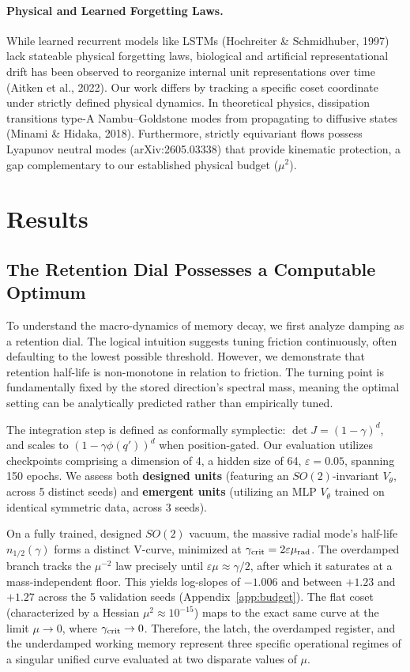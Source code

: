 \documentclass{article}
\begin{document}
\paragraph{Physical and Learned Forgetting Laws.}
While learned recurrent models like LSTMs (Hochreiter \& Schmidhuber, 1997) lack stateable physical forgetting laws, biological and artificial representational drift has been observed to reorganize internal unit representations over time (Aitken et al., 2022). Our work differs by tracking a specific coset coordinate under strictly defined physical dynamics. In theoretical physics, dissipation transitions type-A Nambu--Goldstone modes from propagating to diffusive states (Minami \& Hidaka, 2018). Furthermore, strictly equivariant flows possess Lyapunov neutral modes (arXiv:2605.03338) that provide kinematic protection, a gap complementary to our established physical budget ($\mu^2$).

\section{Results}\label{sec:results}

\subsection{The Retention Dial Possesses a Computable Optimum}\label{sec:vcurve}

To understand the macro-dynamics of memory decay, we first analyze damping as a retention dial. The logical intuition suggests tuning friction continuously, often defaulting to the lowest possible threshold. However, we demonstrate that retention half-life is non-monotone in relation to friction. The turning point is fundamentally fixed by the stored direction's spectral mass, meaning the optimal setting can be analytically predicted rather than empirically tuned.

The integration step is defined as conformally symplectic: $\det J=(1-\gamma)^d$, and scales to $(1-\gamma\phi(q'))^d$ when position-gated. Our evaluation utilizes checkpoints comprising a dimension of 4, a hidden size of 64, $\varepsilon=0.05$, spanning 150 epochs. We assess both \textbf{designed units} (featuring an $SO(2)$-invariant $V_\theta$, across 5 distinct seeds) and \textbf{emergent units} (utilizing an MLP $V_\theta$ trained on identical symmetric data, across 3 seeds).

On a fully trained, designed $SO(2)$ vacuum, the massive radial mode's half-life $n_{1/2}(\gamma)$ forms a distinct V-curve, minimized at $\gamma_{\rm crit}=2\varepsilon\mu_{\rm rad}$. The overdamped branch tracks the $\mu^{-2}$ law precisely until $\varepsilon\mu\approx\gamma/2$, after which it saturates at a mass-independent floor. This yields log-slopes of $-1.006$ and between $+1.23$ and $+1.27$ across the 5 validation seeds (Appendix~\ref{app:budget}). The flat coset (characterized by a Hessian $\mu^2\approx10^{-15}$) maps to the exact same curve at the limit $\mu\to0$, where $\gamma_{\rm crit}\to0$. Therefore, the latch, the overdamped register, and the underdamped working memory represent three specific operational regimes of a singular unified curve evaluated at two disparate values of $\mu$.
\end{document}
